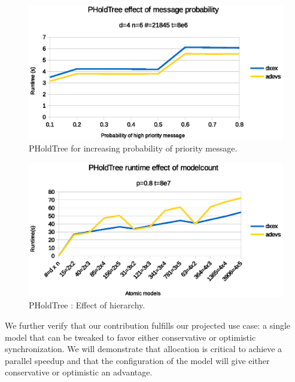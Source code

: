 \begin{figure}
    \center
    \includegraphics[width=\plotfraction\columnwidth]{fig/pholdtree_sequential_p.eps}
    \caption{PHoldTree for increasing probability of priority message.}
    \label{fig:PHoldtree_seq_p_benchmark}
\end{figure}
\begin{figure}
    \center
    \includegraphics[width=\plotfraction\columnwidth]{fig/pholdtree_sequential_dn.eps}
    \caption{PHoldTree : Effect of hierarchy.}
    \label{fig:PHoldtree_seq_dn_benchmark}
\end{figure}

We further verify that our contribution fulfills our projected use case: a single model that can be tweaked to favor either conservative or optimistic synchronization. We will demonstrate that allocation is critical to achieve a parallel speedup and that the configuration of the model will give either conservative or optimistic an advantage.
